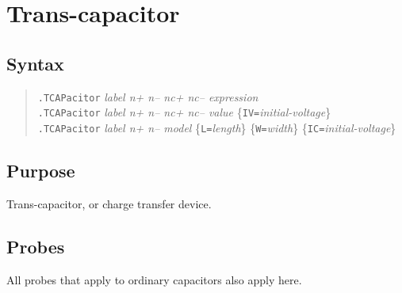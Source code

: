 %
%
%
%
\section{Trans-capacitor}
\subsection{Syntax}
\begin{verse}
  {\tt .TCAPacitor} {\it label n+ n-- nc+ nc-- expression}\\
  {\tt .TCAPacitor} {\it label n+ n-- nc+ nc-- value}
        \{{\tt IV=}{\it initial-voltage}\}\\
  {\tt .TCAPacitor} {\it label n+ n-- model} \{{\tt L=}{\it length}\}
        \{{\tt W=}{\it width}\} \{{\tt IC=}{\it initial-voltage}\}
\end{verse}
\subsection{Purpose}

Trans-capacitor, or charge transfer device.
\subsection{Probes}

All probes that apply to ordinary capacitors also apply here.
